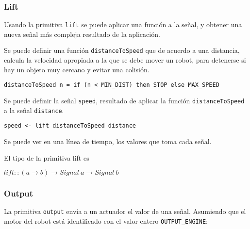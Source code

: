 \subsubsection{Lift}
  Usando la primitiva \texttt{lift} se puede aplicar una función
a la señal, y obtener una nueva señal más compleja resultado de la
aplicación.

  Se puede definir una función \texttt{distanceToSpeed} que de acuerdo
a una distancia, calcula la velocidad apropiada a la que se debe mover
un robot, para detenerse si hay un objeto muy cercano y evitar una colisión.

\begin{center}
\begin{Verbatim}[frame=single]
distanceToSpeed n = if (n < MIN_DIST) then STOP else MAX_SPEED
\end{Verbatim}
\end{center}


  Se puede definir la señal \texttt{speed}, resultado de aplicar la
función \texttt{distanceToSpeed} a la señal \texttt{distance}.

\begin{center}
\begin{Verbatim}[frame=single]
speed <- lift distanceToSpeed distance
\end{Verbatim}
\end{center}

Se puede ver en una línea de tiempo, los valores que toma
cada señal.


El tipo de la primitiva lift es

\begin{center}
  $lift :: (a \rightarrow b) \rightarrow Signal\ a \rightarrow Signal\ b$
\end{center}


\subsubsection{Output}
  La primitiva \texttt{output} envía a un actuador el valor de una señal.
  Asumiendo que el motor del robot está identificado con el valor entero
\texttt{OUTPUT\_ENGINE}:

